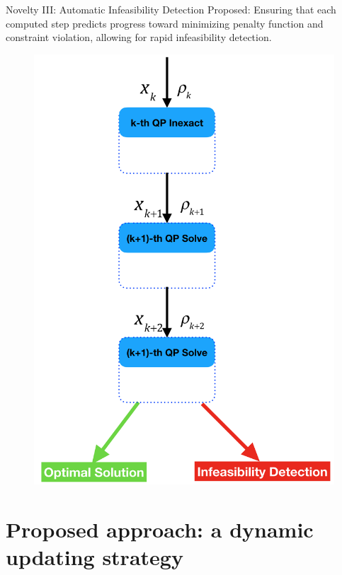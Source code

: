 \documentclass[8pt]{beamer}
\begin{document}
	\begin{frame}[c]{Novelty III: Automatic Infeasibility Detection}
		\vfill
		{\red 
		\leftpointright Proposed:} Ensuring that each computed step predicts progress toward minimizing penalty function and constraint violation,   allowing for rapid {\red infeasibility detection.}
		\vfill
		\begin{figure}[H]
			\includegraphics[scale=0.15]{pic/autoInf}
		\end{figure}
	\end{frame}

	
\section{Proposed approach: a dynamic updating strategy}
\end{document}
